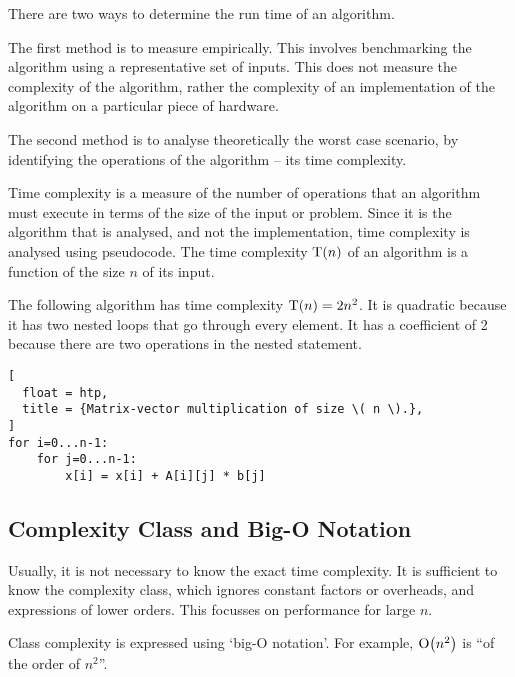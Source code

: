 There are two ways to determine the run time of an algorithm.

The first method is to measure empirically.
This involves benchmarking the algorithm using a representative set of inputs.
This does not measure the complexity of the algorithm, rather the complexity of an implementation of the algorithm on a particular piece of hardware.

The second method is to analyse theoretically the worst case scenario, by identifying the operations of the algorithm -- its time complexity.

Time complexity is a measure of the number of operations that an algorithm must execute in terms of the size of the input or problem.
Since it is the algorithm that is analysed, and not the implementation, time complexity is analysed using pseudocode.
The time complexity \( \textup{T}\!\left( n \right) \) of an algorithm is a function of the size \( n \) of its input.

The following algorithm has time complexity \( \textup{T}\!\left( n \right) = 2 n^2 \).
It is quadratic because it has two nested loops that go through every element.
It has a coefficient of \num{2} because there are two operations in the nested statement.

\begin{lstlisting}[
  float = htp,
  title = {Matrix-vector multiplication of size \( n \).},
]
for i=0...n-1:
    for j=0...n-1:
        x[i] = x[i] + A[i][j] * b[j]
\end{lstlisting}

\subsection{Complexity Class and Big-O Notation}

Usually, it is not necessary to know the exact time complexity.
It is sufficient to know the complexity class, which ignores constant factors or overheads, and expressions of lower orders.
This focusses on performance for large \( n \).

Class complexity is expressed using `big-O notation'.
For example, \( \textup{O}\!\left( n^2 \right) \) is ``of the order of \( n^2 \)''.

